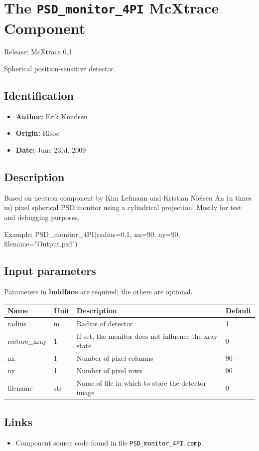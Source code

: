 \section{The \texttt{PSD\_monitor\_4PI} McXtrace Component}
Release: McXtrace 0.1

Spherical position-sensitive detector.

\subsection*{Identification}
\begin{itemize}
  \item \textbf{Author:} Erik Knudsen
  \item \textbf{Origin:} Risoe
  \item \textbf{Date:} June 23rd, 2009
\end{itemize}

\subsection*{Description}
Based on neutron component by Kim Lefmann and Kristian Nielsen An (n times m) pixel spherical PSD monitor using a cylindrical projection. Mostly for test and debugging purposes.

Example: PSD\_monitor\_4PI(radius=0.1, nx=90, ny=90, filename="Output.psd")

\subsection*{Input parameters}
Parameters in \textbf{boldface} are required; the others are optional.

\begin{longtable}{p{}p{}p{}p{}}
\toprule
\textbf{Name} & \textbf{Unit} & \textbf{Description} & \textbf{Default} \\
\midrule
\endhead
radius & m & Radius of detector & 1 \\
restore\_xray & 1 & If set, the monitor does not influence the xray state & 0 \\
nx & 1 & Number of pixel columns & 90 \\
ny & 1 & Number of pixel rows & 90 \\
filename & str & Name of file in which to store the detector image & 0 \\
\bottomrule
\end{longtable}

\subsection*{Links}
\begin{itemize}
  \item Component source code found in file \texttt{PSD\_monitor\_4PI.comp}.
\end{itemize}
